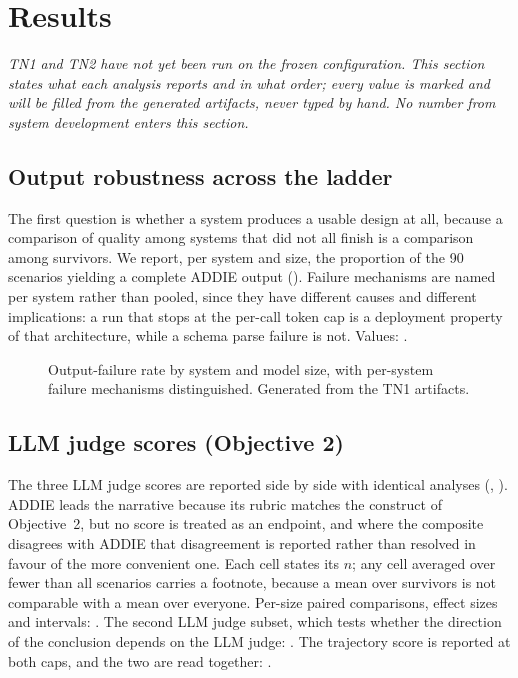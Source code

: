 \section{Results}
\label{sec:results}

\emph{TN1 and TN2 have not yet been run on the frozen configuration. This section
states what each analysis reports and in what order; every value is marked \TBD{}
and will be filled from the generated artifacts, never typed by hand. No number
from system development enters this section.}

\subsection{Output robustness across the ladder}
\label{sec:robustness}

The first question is whether a system produces a usable design at all, because a
comparison of quality among systems that did not all finish is a comparison among
survivors. We report, per system and size, the proportion of the 90 scenarios
yielding a complete ADDIE output (). Failure mechanisms are named per system rather than
pooled, since they have different causes and different implications: a run that
stops at the per-call token cap is a deployment property of that architecture,
while a schema parse failure is not. Values: \TBD.

\begin{figure}[t]
  \centering
  \caption{Output-failure rate by system and model size, with per-system failure
  mechanisms distinguished. Generated from the TN1 artifacts.}
  \label{fig:failure-rate}
\end{figure}

\subsection{LLM judge scores (Objective 2)}
\label{sec:rq1}

The three LLM judge scores are reported side by side with identical analyses
(, ). ADDIE leads the narrative
because its rubric matches the construct of Objective~2, but no score is treated as
an endpoint, and where the composite disagrees with ADDIE that disagreement is
reported rather than resolved in favour of the more convenient one. Each cell states
its $n$; any cell averaged over fewer than all scenarios carries a footnote, because
a mean over survivors is not comparable with a mean over everyone. Per-size paired
comparisons, effect sizes and intervals: \TBD. The second LLM judge subset, which tests
whether the direction of the conclusion depends on the LLM judge: \TBD. The trajectory
score is reported at both caps, and the two are read together: \TBD.

